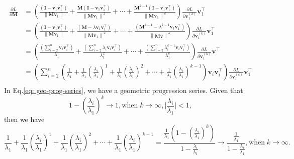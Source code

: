 \documentclass{article}
\newcommand{\bM}{\mathbf{M}}
\newcommand{\bv}{\mathbf{v}}
\newcommand{\bI}{\mathbf{I}}
\begin{document}
	\begin{equation}
	\begin{aligned} 
	\frac{\partial L}{\partial \bM}
	& =\left( \frac{\left(\bI-\bv_1 \bv_1^{\top}\right)}{\left\|\bM \bv_1\right\|}  +
	 \frac{\bM \left(\bI-\bv_1 \bv_1^{\top}\right)}{\left\|\bM \bv_1\right\|^{2}}  + \cdots +
	 \frac{\bM^{k-1} \left(\bI-\bv_1 \bv_1^{\top}\right)}{\left\|\bM \bv_1\right\|^{k}} \right)
	 \frac{\partial L}{\partial \bv_1^{(k)}}\bv_1^{\top} \\
	&=\left( \frac{\left(\bI-\bv_1 \bv_1^{\top}\right)}{\left\|\bM \bv_1\right\|} +
	\frac{\left(\bM-\lambda \bv_1 \bv_1^{\top}\right)}{\left\|\bM \bv_1\right\|^2}  + \cdots +
	\frac{\left(\bM^{k-1} - \lambda^{k-1}\bv_1\bv_1^{\top}\right)}{\left\|\bM \bv\right\|^{k}} \right) \frac{\partial L}{\partial \bv_1^{(k)}} \bv_1^{\top}\\
	&=\left( \frac{\left(\sum_{i=2}^{n}\bv_{i}\bv_{i}^{\top}\right)}{\lambda_1}      +
	\frac{\left(\sum_{i=2}^{n}\lambda_{i}\bv_{i}\bv_{i}^{\top}\right)}{ \lambda_{1}^{2}} +  \cdots +
	\frac{\left(\sum_{i=2}^{n}\lambda_{i}^{k-1}\bv_{i}\bv_{i}^{\top}\right)}{\lambda_{1}^{k}} \right) \frac{\partial L}{\partial \bv_1^{(k)}}
	\bv^{\top}\\
	&=\left(\sum_{i=2}^{n}\left(
	\frac{1}{\lambda_{1}} +
	\frac{1}{\lambda_{1}}\left(\frac{\lambda_{i}}{\lambda_{1}}\right)^{1} +
	\frac{1}{\lambda_{1}}\left(\frac{\lambda_{i}}{\lambda_{1}}\right)^{2} + \cdots +
	\frac{1}{\lambda_{1}}\left(\frac{\lambda_{i}}{\lambda_{1}}\right)^{k-1}
	\right)\bv_{i}\bv_{i}^{\top}
	\right)\frac{\partial L}{\partial \bv_{1}^{(k)}}\bv_{1}^{\top}\\
	\end{aligned}
	\label{eq: geo-prog-series}
	\end{equation}
	In Eq.\ref{eq: geo-prog-series}, we have a geometric progression series.
	Given that $${1 - (\frac{\lambda_{i}}{\lambda_{1}})^k \rightarrow 1}, \text{when} \; k\rightarrow\infty, \vert \frac{\lambda_{i}}{\lambda_{1}} \vert<1,$$
	then we have
	\begin{equation}
	\frac{1}{\lambda_{1}} +
	\frac{1}{\lambda_{1}}\left(\frac{\lambda_{i}}{\lambda_{1}}\right)^{1} +
	\frac{1}{\lambda_{1}}\left(\frac{\lambda_{i}}{\lambda_{1}}\right)^{2} + \cdots +
	\frac{1}{\lambda_{1}}\left(\frac{\lambda_{i}}{\lambda_{1}}\right)^{k-1} = \frac{\frac{1}{\lambda_{1}}(1- (\frac{\lambda_{i}}{\lambda_{1}})^k)} {1 - \frac{\lambda_{i}}{\lambda_{1}}} 
	\rightarrow  \frac{\frac{1}{\lambda_{1}}}
	{1 - \frac{\lambda_{i}}{\lambda_{1}}}, \text{when} \; k\rightarrow\infty.
	\label{eq: geo-prog-series-deduction}
	\end{equation}
	
\end{document}

